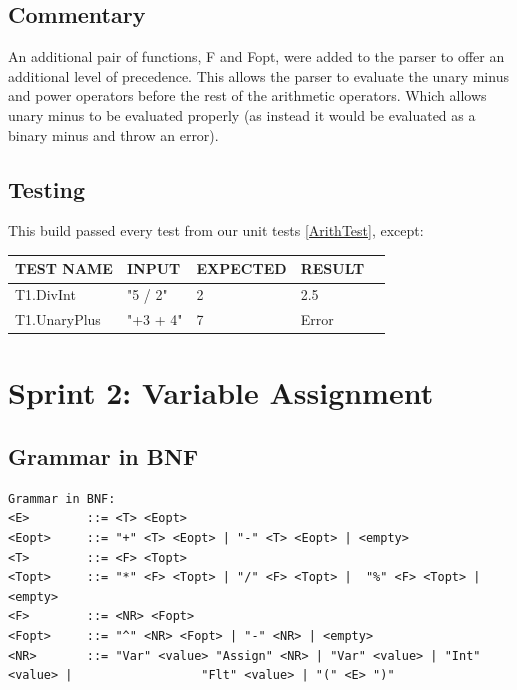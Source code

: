 \documentclass[a4paper, oneside, 11pt]{report}
\begin{document}
    \subsection{Commentary}
    An additional pair of functions, F and Fopt, were added to the parser to offer an additional level of precedence.
    This allows the parser to evaluate the unary minus and power operators before the rest of the arithmetic operators.
    Which allows unary minus to be evaluated properly (as instead it would be evaluated as a binary minus and throw an error).


    \subsection{Testing}
    This build passed every test from our unit tests \ref{ArithTest}, except:

    \begin{center}
        \begin{tabular}{|p{1.5in}|p{1.5in}|p{1in}|p{1.6in}|p{2.4in}|}
            \hline
            TEST NAME & INPUT & EXPECTED & RESULT \\
            \hline
            T1.DivInt & "5 / 2" & 2 & 2.5 \\
            \hline
            T1.UnaryPlus & "+3 + 4" & 7 & Error \\
            \hline
        \end{tabular}
    \end{center}


    \clearpage
    \section{Sprint 2: Variable Assignment}
    \subsection{Grammar in BNF}
    \begin{verbatim}
Grammar in BNF:
<E>        ::= <T> <Eopt>
<Eopt>     ::= "+" <T> <Eopt> | "-" <T> <Eopt> | <empty>
<T>        ::= <F> <Topt>
<Topt>     ::= "*" <F> <Topt> | "/" <F> <Topt> |  "%" <F> <Topt> |<empty>
<F>        ::= <NR> <Fopt>
<Fopt>     ::= "^" <NR> <Fopt> | "-" <NR> | <empty>
<NR>       ::= "Var" <value> "Assign" <NR> | "Var" <value> | "Int" <value> |                  "Flt" <value> | "(" <E> ")"

    \end{verbatim}
\end{document}
